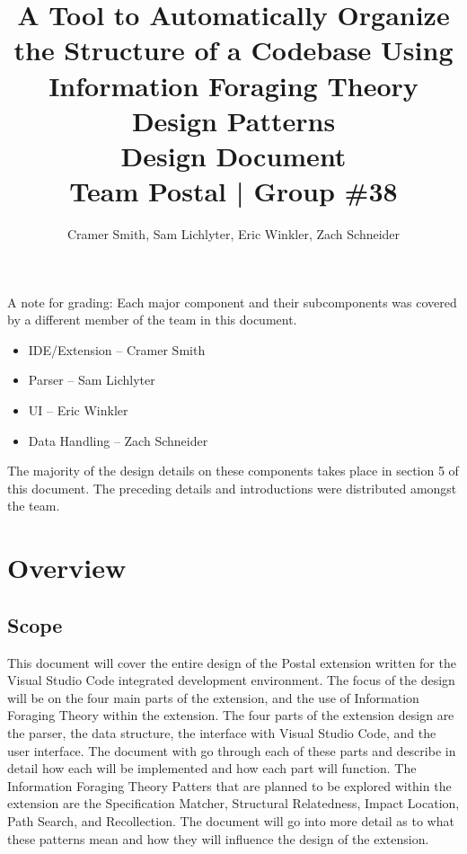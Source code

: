 \documentclass[letterpaper,10pt,titlepage,draftclsnofoot,onecolumn,onesided] {IEEEtran}
\def\doctitle{A Tool to Automatically Organize the Structure of a Codebase Using Information Foraging Theory Design Patterns}
\def\doctype{Design Document}
\def\team{Team Postal | Group \#38}
\begin{document}
\title{\Huge{\bfseries{\textsf{\doctitle}}}\\\textsf{\Large{\doctype}}\\\textsf{\large{\team}}}
\author{Cramer Smith, Sam Lichlyter, Eric Winkler, Zach Schneider}

\maketitle
\vfill
\vfill

\pagebreak

\tableofcontents

\pagebreak

A note for grading: Each major component and their subcomponents was covered by a different member of the team in this document. 
\begin{itemize}
\item IDE/Extension -- Cramer Smith
\item Parser -- Sam Lichlyter
\item UI -- Eric Winkler
\item Data Handling -- Zach Schneider
\end{itemize}
The majority of the design details on these components takes place in section 5 of this document. The preceding details and introductions were distributed amongst the team.

\pagebreak

\section{Overview}

\subsection{Scope}
This document will cover the entire design of the Postal extension written for the Visual Studio Code integrated development environment. 
The focus of the design will be on the four main parts of the extension, and the use of Information Foraging Theory within the extension.
The four parts of the extension design are the parser, the data structure, the interface with Visual Studio Code, and the user interface.
The document with go through each of these parts and describe in detail how each will be implemented and how each part will function.
The Information Foraging Theory Patters that are planned to be explored within the extension are the Specification Matcher, Structural Relatedness, Impact Location, Path Search, and Recollection.
The document will go into more detail as to what these patterns mean and how they will influence the design of the extension.
\end{document}
